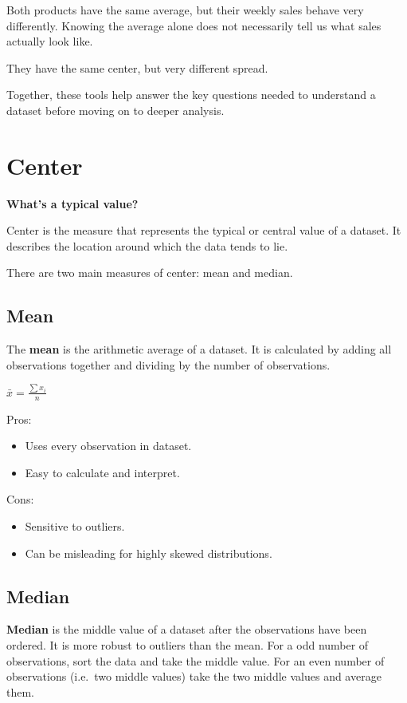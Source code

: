 \documentclass[
  letterpaper,
  DIV=11,
  numbers=noendperiod]{scrreprt}
\providecommand{\tightlist}{%
  \setlength{\itemsep}{0pt}\setlength{\parskip}{0pt}}
\begin{document}
Both products have the same average, but their weekly sales behave very
differently. Knowing the average alone does not necessarily tell us what
sales actually look like.

They have the same center, but very different spread.

Together, these tools help answer the key questions needed to understand
a dataset before moving on to deeper analysis.

\section{Center}\label{center}

\textbf{What's a typical value?}

Center is the measure that represents the typical or central value of a
dataset. It describes the location around which the data tends to lie.

There are two main measures of center: mean and median.

\subsection{Mean}\label{mean}

The \textbf{mean} is the arithmetic average of a dataset. It is
calculated by adding all observations together and dividing by the
number of observations.

\(\bar{x} = \frac{\sum{x_i}}{n}\)

Pros:

\begin{itemize}
\tightlist
\item
  Uses every observation in dataset.
\item
  Easy to calculate and interpret.
\end{itemize}

Cons:

\begin{itemize}
\tightlist
\item
  Sensitive to outliers.
\item
  Can be misleading for highly skewed distributions.
\end{itemize}

\subsection{Median}\label{median}

\textbf{Median} is the middle value of a dataset after the observations
have been ordered. It is more robust to outliers than the mean. For a
odd number of observations, sort the data and take the middle value. For
an even number of observations (i.e.~two middle values) take the two
middle values and average them.
\end{document}
